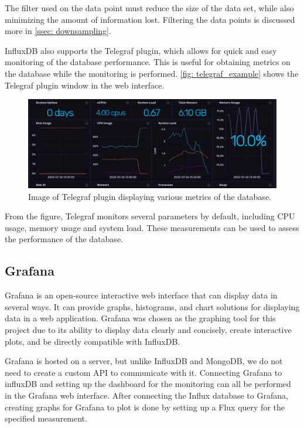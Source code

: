 \documentclass[main.tex]{subfiles}
\begin{document}
The filter used on the data point must reduce the size of the data set, while also minimizing the amount of information lost. Filtering the data points is discussed more in \autoref{ssec: downsampling}.

InfluxDB also supports the Telegraf plugin, which allows for quick and easy monitoring of the database performance. This is useful for obtaining metrics on the database while the monitoring is performed. \autoref{fig: telegraf_example} shows the Telegraf plugin window in the web interface.

\begin{figure}[!htpb]
    \centering
    \includegraphics[width=17cm, scale=4]{images/telegraf_example.png}
    \caption{Image of Telegraf plugin displaying various metrics of the database.}
    \label{fig: telegraf_example}
\end{figure}
\FloatBarrier

From the figure, Telegraf monitors several parameters by default, including CPU usage, memory usage and system load. These measurements can be used to assess the performance of the database.

\subsection{Grafana}
\label{ssec: grafana}
Grafana is an open-source interactive web interface that can display data in several ways. It can provide graphs, histograms, and chart solutions for displaying data in a web application. Grafana was chosen as the graphing tool for this project due to its ability to display data clearly and concisely, create interactive plots, and be directly compatible with InfluxDB.

Grafana is hosted on a server, but unlike InfluxDB and MongoDB, we do not need to create a custom API to communicate with it. Connecting Grafana to influxDB and setting up the dashboard for the monitoring can all be performed in the Grafana web interface. After connecting the Influx database to Grafana, creating graphs for Grafana to plot is done by setting up a Flux query for the specified measurement.
\end{document}
